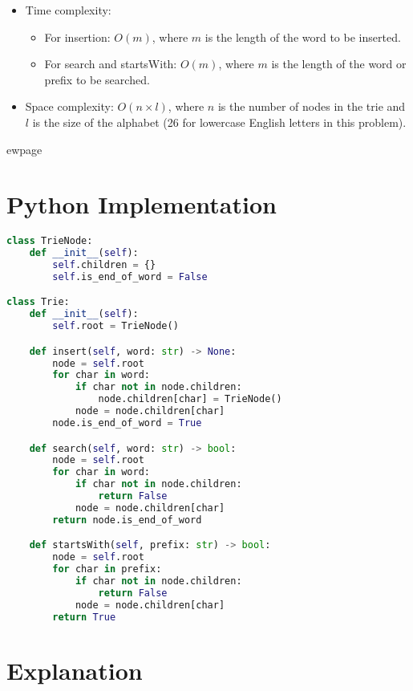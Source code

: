 \begin{itemize}
	\item Time complexity:
	\begin{itemize}
		\item For insertion: $O(m)$, where $m$ is the length of the word to be inserted.
		\item For search and startsWith: $O(m)$, where $m$ is the length of the word or prefix to be searched.
	\end{itemize}
	\item Space complexity: $O(n \times l)$, where $n$ is the number of nodes in the trie and $l$ is the size of the alphabet (26 for lowercase English letters in this problem).
\end{itemize}


ewpage 
\section*{Python Implementation}

\begin{fullwidth}
\begin{lstlisting}[language=Python]
class TrieNode:
    def __init__(self):
        self.children = {}
        self.is_end_of_word = False

class Trie:
    def __init__(self):
        self.root = TrieNode()

    def insert(self, word: str) -> None:
        node = self.root
        for char in word:
            if char not in node.children:
                node.children[char] = TrieNode()
            node = node.children[char]
        node.is_end_of_word = True

    def search(self, word: str) -> bool:
        node = self.root
        for char in word:
            if char not in node.children:
                return False
            node = node.children[char]
        return node.is_end_of_word

    def startsWith(self, prefix: str) -> bool:
        node = self.root
        for char in prefix:
            if char not in node.children:
                return False
            node = node.children[char]
        return True
\end{lstlisting}

\end{fullwidth}

\section*{Explanation}


